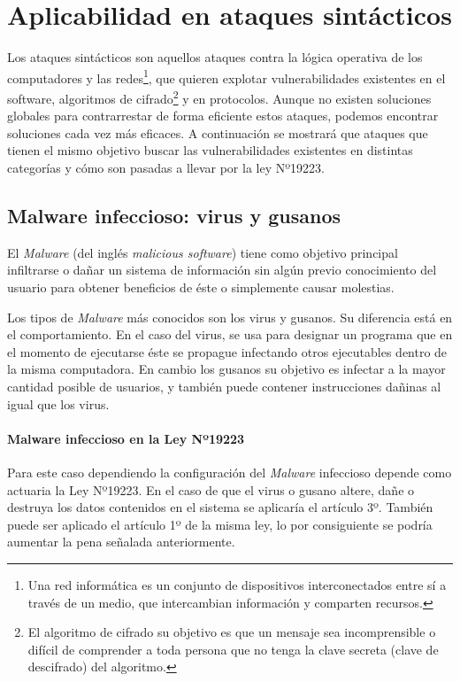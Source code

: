 \chapter{Aplicabilidad en ataques sintácticos}
\label{chap:sintact}
Los ataques sintácticos son aquellos ataques contra la lógica operativa de los computadores y las redes\footnote{Una red informática es un conjunto de dispositivos interconectados entre sí a través de un medio, que intercambian información y comparten recursos.}, que quieren explotar vulnerabilidades existentes en el software, algoritmos de cifrado\footnote{El algoritmo de cifrado su objetivo es que un mensaje sea incomprensible o difícil de comprender a toda persona que no tenga la clave secreta (clave de descifrado) del algoritmo.} y en protocolos. Aunque no existen soluciones globales para contrarrestar de forma eficiente estos ataques, podemos encontrar soluciones cada vez más eficaces. A continuación se mostrará que ataques que tienen el mismo objetivo buscar las vulnerabilidades existentes en distintas categorías y cómo son pasadas a llevar por la ley Nº19223.

\section{Malware infeccioso: virus y gusanos}
El \textit{Malware} (del inglés \textit{malicious software}) tiene como objetivo principal infiltrarse o dañar un sistema de información sin algún previo conocimiento del usuario para obtener beneficios de éste o simplemente causar molestias.

Los tipos de \textit{Malware} más conocidos son los virus y gusanos. Su diferencia está en el comportamiento. En el caso del virus, se usa para designar un programa que en el momento de ejecutarse éste se propague infectando otros ejecutables dentro de la misma computadora. En cambio los gusanos su objetivo es infectar a la mayor cantidad posible de usuarios, y también puede contener instrucciones dañinas al igual que los virus.

\subsubsection{Malware infeccioso en la Ley Nº19223}
Para este caso dependiendo la configuración del \textit{Malware} infeccioso depende como actuaria la Ley Nº19223. En el caso de que el virus o gusano altere, dañe o destruya los datos contenidos en el sistema se aplicaría el artículo 3º. También puede ser aplicado el artículo 1º de la misma ley, lo por consiguiente se podría aumentar la pena señalada anteriormente.


